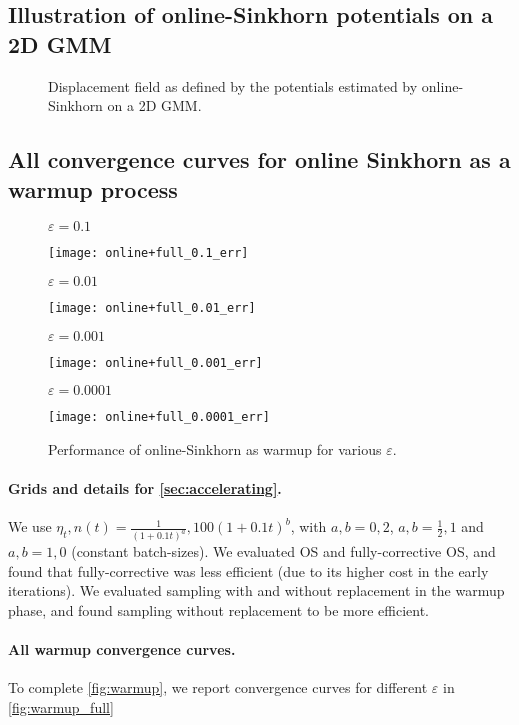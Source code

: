 \subsection{Illustration of online-Sinkhorn potentials on a 2D GMM}

\begin{figure}[htbp]
    \centering
    
    \caption{Displacement field as defined by the potentials estimated by online-Sinkhorn on a 2D GMM.}
    \label{fig:potentials_2d}
\end{figure}


\subsection{All convergence curves for online Sinkhorn as a warmup process}\label{app:warmup_exp}


\begin{figure}[t]
    \centering
    $\varepsilon = 0.1$

    \texttt{[image: online+full\_0.1\_err]}
    
    $\varepsilon = 0.01$

    \texttt{[image: online+full\_0.01\_err]}

    $\varepsilon = 0.001$

    \texttt{[image: online+full\_0.001\_err]}

    $\varepsilon = 0.0001$

    \texttt{[image: online+full\_0.0001\_err]}
    \caption{Performance of online-Sinkhorn as warmup for various $\varepsilon$.}
    \label{fig:warmup_full}
\end{figure}

\paragraph{Grids and details for \autoref{sec:accelerating}.} We use $\eta_t, n(t)
= \frac{1}{(1 + 0.1t)^a}, 100 (1 + 0.1t)^{b}$, with $a, b = 0, 2$, $a, b =
\frac{1}{2}, 1$ and $a,b =1, 0$ (constant batch-sizes). We evaluated OS and
fully-corrective OS, and found that fully-corrective was less efficient (due to
its higher cost in the early iterations). We evaluated sampling with and without
replacement in the warmup phase, and found sampling without replacement to be
more efficient.

\paragraph{All warmup convergence curves.} To complete \autoref{fig:warmup}, we report convergence curves for different $\varepsilon$ in \autoref{fig:warmup_full}


